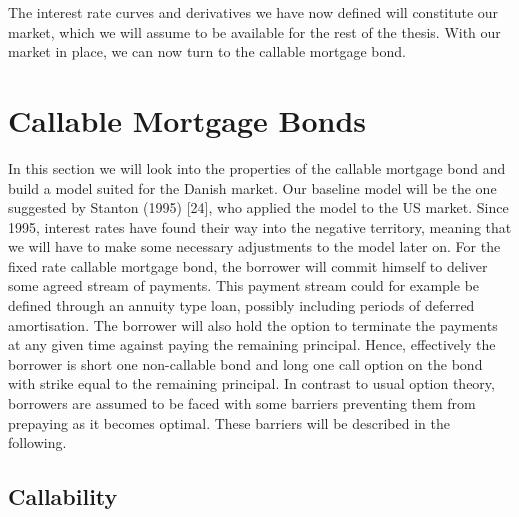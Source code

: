 \documentclass[12pt,twoside]{reedthesis}
\begin{document}
The interest rate curves and derivatives we have now defined will constitute our market, which we will assume to be available for the rest of the thesis. With our market in place, we can now turn to the callable mortgage bond.

\hypertarget{callable-mortgage-bonds}{%
\chapter{Callable Mortgage Bonds}\label{callable-mortgage-bonds}}

In this section we will look into the properties of the callable mortgage bond and build a model suited for the Danish market. Our baseline model will be the one suggested by Stanton (1995) {[}24{]}, who applied the model to the US market. Since 1995, interest rates have found their way into the negative territory, meaning that we will have to make some necessary adjustments to the model later on. For the fixed rate callable mortgage bond, the borrower will commit himself to deliver some agreed stream of payments. This payment stream could for example be defined through an annuity type loan, possibly including periods of deferred amortisation. The borrower will also hold the option to terminate the payments at any given time against paying the remaining principal. Hence, effectively the borrower is short one non-callable bond and long one call option on the bond with strike equal to the remaining principal. In contrast to usual option theory, borrowers are assumed to be faced with some barriers preventing them from prepaying as it becomes optimal. These barriers will be described in the following.

\hypertarget{callability}{%
\section{Callability}\label{callability}}
\end{document}

